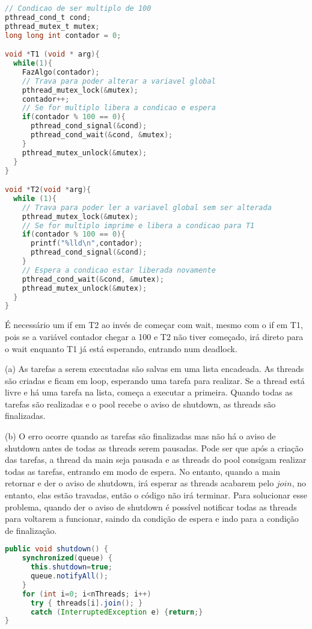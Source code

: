\documentclass{homework}
\begin{document}
\exercise*
\begin{lstlisting}[language=C]
// Condicao de ser multiplo de 100
pthread_cond_t cond; 
pthread_mutex_t mutex;
long long int contador = 0;

void *T1 (void * arg){
  while(1){
    FazAlgo(contador);
    // Trava para poder alterar a variavel global
    pthread_mutex_lock(&mutex);  
    contador++;
    // Se for multiplo libera a condicao e espera
    if(contador % 100 == 0){ 
      pthread_cond_signal(&cond);
      pthread_cond_wait(&cond, &mutex);
    }
    pthread_mutex_unlock(&mutex);
  }
}

void *T2(void *arg){
  while (1){
    // Trava para poder ler a variavel global sem ser alterada
    pthread_mutex_lock(&mutex); 
    // Se for multiplo imprime e libera a condicao para T1
    if(contador % 100 == 0){ 
      printf("%lld\n",contador);
      pthread_cond_signal(&cond);
    }
    // Espera a condicao estar liberada novamente
    pthread_cond_wait(&cond, &mutex); 
    pthread_mutex_unlock(&mutex);
  }
}
\end{lstlisting}
É necessário um if em T2 ao invés de começar com wait, mesmo com o if em T1, pois se a variável contador chegar a 100 e T2 não tiver começado, irá direto para o wait enquanto T1 já está esperando, entrando num deadlock.

\exercise*
(a) As tarefas a serem executadas são salvas em uma lista encadeada. As threads são criadas e ficam em loop, esperando uma tarefa para realizar. Se a thread está livre e há uma tarefa na lista, começa a executar a primeira. Quando todas as tarefas são realizadas e o pool recebe o aviso de shutdown, as threads são finalizadas.

(b) O erro ocorre quando as tarefas são finalizadas mas não há o aviso de shutdown antes de todas as threads serem pausadas. Pode ser que após a criação das tarefas, a thread da main seja pausada e as threads do pool consigam realizar todas as tarefas, entrando em modo de espera. No entanto, quando a main retornar e der o aviso de shutdown, irá esperar as threads acabarem pelo $join$, no entanto, elas estão travadas, então o código não irá terminar. Para solucionar esse problema, quando der o aviso de shutdown é possível notificar todas as threads para voltarem a funcionar, saindo da condição de espera e indo para a condição de finalização.
\begin{lstlisting}[language=Java]
public void shutdown() {
    synchronized(queue) {
      this.shutdown=true;
      queue.notifyAll();
    }
    for (int i=0; i<nThreads; i++)
      try { threads[i].join(); }
      catch (InterruptedException e) {return;}
}
\end{lstlisting}
\end{document}
